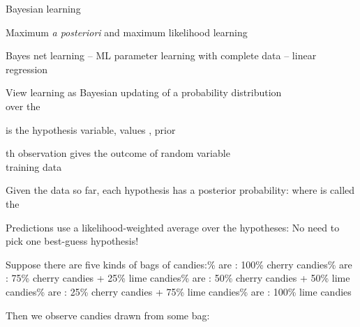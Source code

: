 \documentclass{article}
\begin{document}
\begin{huge}

\sf


\blob Bayesian learning

\blob Maximum {\em a posteriori} and maximum likelihood learning

\blob Bayes net learning\nl
-- ML parameter learning with complete data\nl
-- linear regression



View learning as Bayesian updating of a probability distribution\\
over the 

 is the hypothesis variable, values , prior 

th observation  gives the outcome of random variable \\
training data 


Given the data so far, each hypothesis has a posterior probability:
\mat{\[
  P(h_i|\d) = \alpha P(\d|h_i) P(h_i)
\]}%
where  is called the 

Predictions use a likelihood-weighted average over the hypotheses:
\mat{\[
  \pv(X|\d) = \mysum_i\ \pv(X|\d,h_i) P(h_i|\d) = \mysum_i\ \pv(X|h_i) P(h_i|\d)
\]}%
No need to pick one best-guess hypothesis!



Suppose there are five kinds of bags of candies:\% are : 100\% cherry candies\% are : 75\% cherry candies + 25\% lime candies\% are : 50\% cherry candies + 50\% lime candies\% are : 25\% cherry candies + 75\% lime candies\% are : 100\% lime candies

\vspace*{0.2in}

\textwidth
{}

Then we observe candies drawn from some bag: \textwidth {}


\end{huge}
\end{document}
